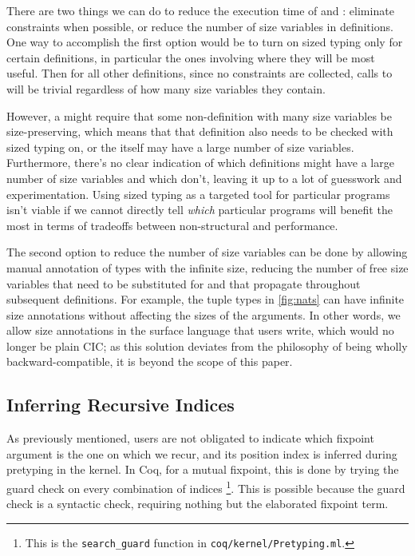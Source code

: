 There are two things we can do to reduce the execution time of \solve and \RecCheck:
eliminate constraints when possible, or reduce the number of size variables in definitions.
One way to accomplish the first option would be to turn on sized typing only for certain definitions,
in particular the ones involving \cofixpoints where they will be most useful.
Then for all other definitions, since no constraints are collected,
calls to \solve will be trivial regardless of how many size variables they contain.

However, a \cofixpoint might require that some non-\corecursive definition with many size variables be size-preserving,
which means that that definition also needs to be checked with sized typing on,
or the \cofixpoint itself may have a large number of size variables.
Furthermore, there's no clear indication of which definitions might have a large number of size variables and which don't,
leaving it up to a lot of guesswork and experimentation.
Using sized typing as a targeted tool for particular programs isn't viable
if we cannot directly tell \emph{which} particular programs will benefit the most
in terms of tradeoffs between non-structural \corecursion and performance.

The second option to reduce the number of size variables can be done by allowing manual annotation of \coinductive types with the infinite size,
reducing the number of free size variables that need to be substituted for
and that propagate throughout subsequent definitions.
For example, the tuple types in \autoref{fig:nats} can have infinite size annotations
without affecting the sizes of the  arguments.
In other words, we allow size annotations in the surface language that users write,
which would no longer be plain CIC;
as this solution deviates from the philosophy of being wholly backward-compatible,
it is beyond the scope of this paper.

\subsection{Inferring Recursive Indices}\label{sec:impl:recind}

As previously mentioned, users are not obligated to indicate which fixpoint argument is the one on which we recur,
and its position index is inferred during pretyping in the kernel.
In Coq, for a mutual fixpoint, this is done by trying the guard check on every combination of indices%
\footnote{This is the \texttt{search\_guard} function in \texttt{coq/kernel/Pretyping.ml}.}.
This is possible because the guard check is a syntactic check, requiring nothing but the elaborated fixpoint term.


